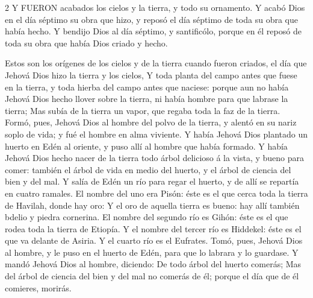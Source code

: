 
\lettrine{2}{}
Y FUERON acabados los cielos y la tierra, y todo su ornamento. 
Y acabó Dios en el día séptimo su obra que hizo, y reposó el día séptimo de toda su obra que había hecho. 
Y bendijo Dios al día séptimo, y santificólo, porque en él reposó de toda su obra que había Dios criado y hecho. 



Estos son los orígenes de los cielos y de la tierra cuando fueron criados, el día que Jehová Dios hizo la tierra y los cielos, 
Y toda planta del campo antes que fuese en la tierra, y toda hierba del campo antes que naciese: porque aun no había Jehová Dios hecho llover sobre la tierra, ni había hombre para que labrase la tierra; 
Mas subía de la tierra un vapor, que regaba toda la faz de la tierra. 
Formó, pues, Jehová Dios al hombre del polvo de la tierra, y alentó en su nariz soplo de vida; y fué el hombre en alma viviente. 
Y había Jehová Dios plantado un huerto en Edén al oriente, y puso allí al hombre que había formado. 
Y había Jehová Dios hecho nacer de la tierra todo árbol delicioso á la vista, y bueno para comer: también el árbol de vida en medio del huerto, y el árbol de ciencia del bien y del mal. 
Y salía de Edén un río para regar el huerto, y de allí se repartía en cuatro ramales. 
El nombre del uno era Pisón: éste es el que cerca toda la tierra de Havilah, donde hay oro: 
Y el oro de aquella tierra es bueno: hay allí también bdelio y piedra cornerina. 
El nombre del segundo río es Gihón: éste es el que rodea toda la tierra de Etiopía. 
Y el nombre del tercer río es Hiddekel: éste es el que va delante de Asiria. Y el cuarto río es el Eufrates. 
Tomó, pues, Jehová Dios al hombre, y le puso en el huerto de Edén, para que lo labrara y lo guardase. 
Y mandó Jehová Dios al hombre, diciendo: De todo árbol del huerto comerás; 
Mas del árbol de ciencia del bien y del mal no comerás de él; porque el día que de él comieres, morirás. 
